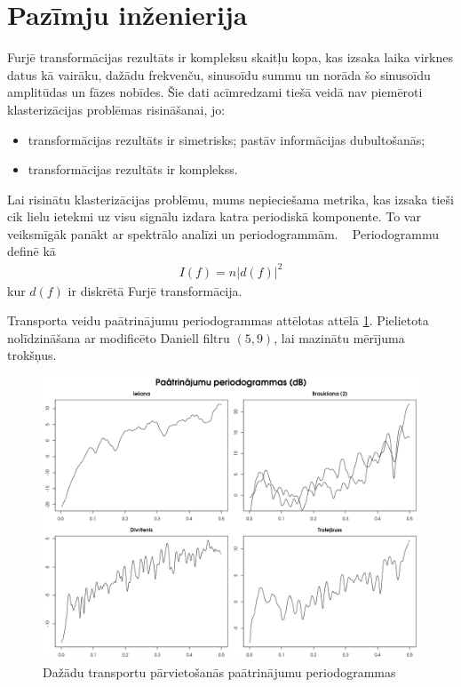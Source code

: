 \documentclass{ludis}
\begin{document}
\section{Pazīmju inženierija}
Furjē transformācijas rezultāts ir kompleksu skaitļu kopa, kas izsaka laika virknes datus
kā vairāku, dažādu frekvenču, sinusoīdu summu un norāda šo sinusoīdu amplitūdas un fāzes nobīdes.
Šie dati acīmredzami tiešā veidā nav piemēroti klasterizācijas problēmas risināšanai, jo:
\begin{itemize}
\item transformācijas rezultāts ir simetrisks; pastāv informācijas dubultošanās;
\item transformācijas rezultāts ir komplekss.
\end{itemize}

Lai risinātu klasterizācijas problēmu, mums nepieciešama metrika, kas izsaka tieši cik lielu 
ietekmi uz visu signālu izdara katra periodiskā komponente. To var veiksmīgāk panākt ar 
spektrālo analīzi un periodogrammām. ~\cite{bloomfield2004} Periodogrammu definē kā
\begin{align*}
  I(f) = n | d(f) |^2
\end{align*}
kur $d(f)$ ir diskrētā Furjē transformācija.

Transporta veidu paātrinājumu periodogrammas attēlotas attēlā \ref{fig:periodograms}. Pielietota
nolīdzināšana ar modificēto Daniell filtru $(5, 9)$, lai mazinātu mērījuma trokšņus.

\begin{figure}
  \centering
  \includegraphics[scale=0.5]{img/periodograms}
  \caption{Dažādu transportu pārvietošanās paātrinājumu periodogrammas}
  \label{fig:periodograms}
\end{figure}
\end{document}

